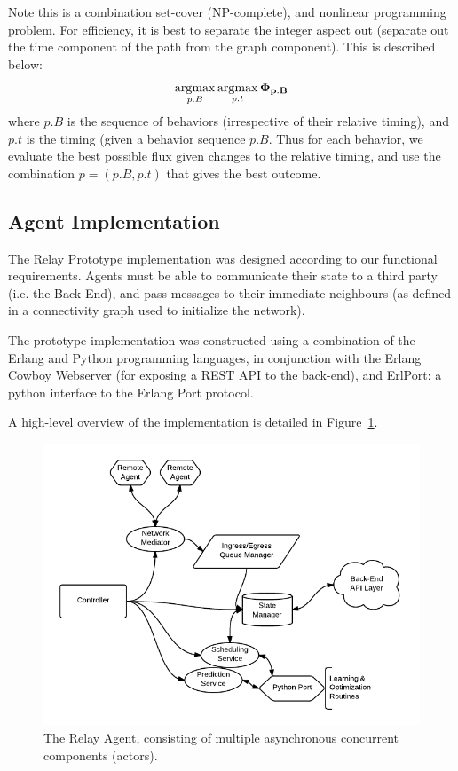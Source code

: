 \documentclass{report}
\DeclareMathOperator*{\argmax}{\arg\!\max}
\begin{document}
Note this is a combination set-cover (NP-complete), and nonlinear programming problem.
For efficiency, it is best to separate the integer aspect out (separate out the time component of the path from the graph component).
This is described below:
\begin{equation}\label{eq:def:minlp_objective}
	\argmax_{p.B} \argmax_{p.t} \bf{\Phi}_{p.B}
\end{equation}
where $p.B$ is the sequence of behaviors (irrespective of their relative timing), and $p.t$ is the timing (given a behavior sequence $p.B$.
Thus for each behavior, we evaluate the best possible flux given changes to the relative timing, and use the combination $p =  (p.B, p.t)$ that gives the best outcome.

\subsection{Agent Implementation}

The Relay Prototype implementation was designed according to our functional requirements.
Agents must be able to communicate their state to a third party (i.e. the Back-End), and pass messages to their immediate neighbours (as defined in a connectivity graph used to initialize the network).

The prototype implementation was constructed using a combination of the Erlang and Python programming languages, in conjunction with the Erlang Cowboy Webserver (for exposing a REST API to the back-end), and ErlPort: a python interface to the Erlang Port protocol.

A high-level overview of the implementation is detailed in Figure~\ref{fig:agent_implementation}.
\begin{figure}\label{fig:agent_implementation}
	\includegraphics[width=\textwidth]{figures/Relay_agent_diagram.png}
	\caption{The Relay Agent, consisting of multiple asynchronous concurrent components (actors).}
\end{figure}
\end{document}
